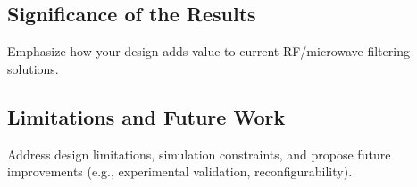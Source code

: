 \documentclass[conference]{IEEEtran}
\begin{document}
\subsection{Significance of the Results}
Emphasize how your design adds value to current RF/microwave filtering solutions.

\subsection{Limitations and Future Work}
Address design limitations, simulation constraints, and propose future improvements (e.g., experimental validation, reconfigurability).







\end{document}
